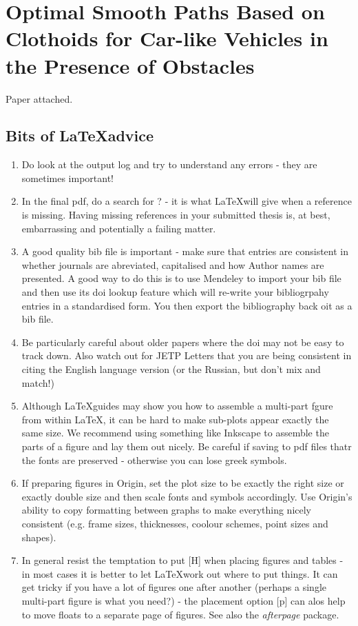 \chapter{Optimal Smooth Paths Based on Clothoids for Car-like Vehicles in the Presence of Obstacles}
\label{sec:ijcas}
Paper attached.


\section{Bits of \LaTeX advice}

\begin{enumerate}
	\item Do look at the output log and try to understand any errors - they are sometimes important!
	\item In the final pdf, do a search for ? - it is what \LaTeX will give when a reference is missing. Having missing references in your submitted thesis is, at best, embarrassing and potentially a failing matter.
	\item A good quality bib file is important - make sure that entries are consistent in whether journals are abreviated, capitalised and how Author names are presented. A good way to do this is to use Mendeley to import your bib file and then use its doi lookup feature which will re-write your bibliogrpahy entries in a standardised form. You then export the bibliography back oit as a bib file.
	\item Be particularly careful about older papers where the doi may not be easy to track down. Also watch out for JETP Letters that you are being consistent in citing the English language version (or the Russian, but don't mix and match!)
	\item Although \LaTeX guides may show you how to assemble a multi-part fgure from within \LaTeX, it can be hard to make sub-plots appear exactly the same size. We recommend using something like Inkscape to assemble the parts of a figure and lay them out nicely. Be careful if saving to pdf files thatr the fonts are preserved - otherwise you can lose greek symbols.
	\item If preparing figures in Origin, set the plot size to be exactly the right size or exactly double size and then scale fonts and symbols accordingly. Use Origin's ability to copy formatting between graphs to make everything nicely consistent (e.g. frame sizes, thicknesses, coolour schemes, point sizes and shapes).
	\item In general resist the temptation to put [H] when placing figures and tables - in most cases it is better to let \LaTeX work out where to put things. It can get tricky if you have a lot of figures one after another (perhaps a single multi-part figure is what you need?) - the placement option [p] can alos help to move floats to a separate page of figures. See also the \textit{afterpage} package. 
\end{enumerate}